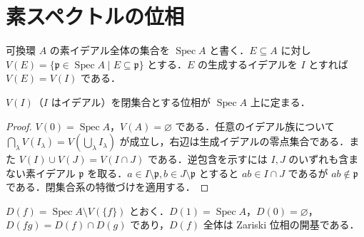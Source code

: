 \section{素スペクトルの位相}
\begin{defn}[素スペクトルと零点集合]
可換環 $A$ の素イデアル全体の集合を $\operatorname{Spec}A$ と書く．$E\subseteq A$ に対し $V(E)=\{\mathfrak p\in\operatorname{Spec}A\mid E\subseteq\mathfrak p\}$ とする．$E$ の生成するイデアルを $I$ とすれば $V(E)=V(I)$ である．
\end{defn}
\begin{prop}[Zariski位相]
$V(I)$（$I$ はイデアル）を閉集合とする位相が $\operatorname{Spec}A$ 上に定まる．
\end{prop}
\begin{proof}
$V(0)=\operatorname{Spec}A$，$V(A)=\varnothing$ である．任意のイデアル族について $\bigcap_\lambda V(I_\lambda)=V(\bigcup_\lambda I_\lambda)$ が成立し，右辺は生成イデアルの零点集合である．また $V(I)\cup V(J)=V(I\cap J)$ である．逆包含を示すには $I,J$ のいずれも含まない素イデアル $\mathfrak p$ を取る．$a\in I\setminus\mathfrak p,b\in J\setminus\mathfrak p$ とすると $ab\in I\cap J$ であるが $ab\notin\mathfrak p$ である．閉集合系の特徴づけを適用する．
\end{proof}
\begin{prop}[基本開集合]
$D(f)=\operatorname{Spec}A\setminus V(\{f\})$ とおく．$D(1)=\operatorname{Spec}A$，$D(0)=\varnothing$，$D(fg)=D(f)\cap D(g)$ であり，$D(f)$ 全体は Zariski 位相の開基である．
\end{prop}
